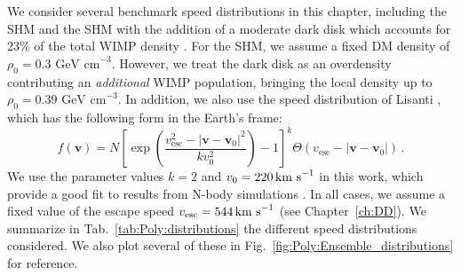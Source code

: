 We consider several benchmark speed distributions in this chapter, including the SHM and the SHM with the addition of a moderate dark disk which accounts for 23\% of the total WIMP density \cite{Bruch:2009}. For the SHM, we assume a fixed DM density of $\rho_0 = 0.3 \textrm{ GeV cm}^{-3}$. However, we treat the dark disk as an overdensity contributing an \textit{additional} WIMP population, bringing the local density up to $\rho_0 = 0.39 \textrm{ GeV cm}^{-3}$. In addition, we also use the speed distribution of Lisanti \etal \cite{Lisanti:2010}, which has the following form in the Earth's frame:
\begin{equation}
\label{eq:Poly:lisanti}
f(\textbf{v}) = N \left[\exp\left(\frac{v_\textrm{esc}^2 - |\textbf{v} - \textbf{v}_0|^2}{k v_0^2}\right) -1\right]^k \Theta(v_\textrm{esc} - |\textbf{v} - \textbf{v}_0|)\,.
\end{equation}
We use the parameter values $k = 2$ and $v_0 = 220 \,\textrm{km s}^{-1}$ in this work, which provide a good fit to results from N-body simulations \cite{Lisanti:2010}. In all cases, we assume a fixed value of the escape speed $\vesc = 544 \kms$ (see Chapter~\ref{ch:DD}). We summarize in Tab.~\ref{tab:Poly:distributions} the different speed distributions considered. We also plot several of these in Fig.~\ref{fig:Poly:Ensemble_distributions} for reference.

